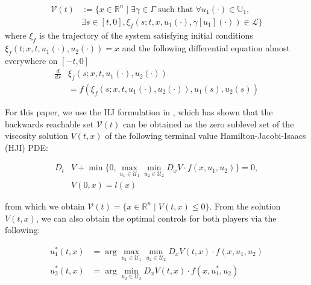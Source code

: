 \begin{equation}
\begin{aligned}
\mathcal{V}(t) &:= \{x\in\mathbb{R}^n \mid \exists \gamma\in\Gamma \text{ such that } \forall u_1(\cdot)\in\mathbb{U}_1, \\
&\exists s \in [t,0], \xi_f(s; t, x, u_1(\cdot), \gamma[u_1](\cdot)) \in \mathcal{L} \}
\end{aligned}
\end{equation}
where $\xi_f$ is the trajectory of the system satisfying initial conditions $\xi_f(t; x, t, u_1(\cdot), u_2(\cdot))=x$ and the following differential equation almost everywhere on $[-t, 0]$
\begin{equation}
\begin{aligned}
\frac{d}{ds}&\xi_f(s; x, t, u_1(\cdot), u_2(\cdot)) \\
&= f(\xi_f(s; x, t, u_1(\cdot), u_2(\cdot)), u_1(s), u_2(s))
\end{aligned}
\end{equation}

For this paper, we use the HJ formulation in \cite{Mitchell05}, which has shown that the backwards reachable set $\mathcal{V}(t)$ can be obtained as the zero sublevel set of the viscosity solution \cite{Crandall84} $V(t,x)$ of the following terminal value Hamilton-Jacobi-Isaacs (HJI) PDE:

\begin{equation} \label{eq:HJIPDE}
\begin{aligned}
D_t &V +\min \{0, \max_{u_1\in\mathcal{U}_1} \min_{u_2\in\mathcal{U}_2} D_x V \cdot f(x,u_1,u_2) \} = 0, \\
&V(0,x) = l(x)
\end{aligned}
\end{equation}

\noindent from which we obtain $\mathcal{V}(t) = \{x\in\mathbb{R}^n \mid V(t,x)\le 0\}$. From the solution $V(t,x)$, we can also obtain the optimal controls for both players via the following:

\begin{equation} \label{eq:HJI_ctrl_syn}
\begin{aligned}
u_1^*(t,x) &= \arg \max_{u_1\in\mathcal{U}_1} \min_{u_2\in\mathcal U_2} D_x V(t,x) \cdot f(x,u_1,u_2)\\
u_2^*(t,x) &= \arg \min_{u_2\in\mathcal{U}_2} D_x V(t,x) \cdot f(x,u_1^*,u_2)
\end{aligned}
\end{equation}

